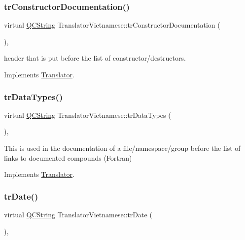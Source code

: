 \subsubsection{\texorpdfstring{trConstructorDocumentation()}{trConstructorDocumentation()}}
{\footnotesize\ttfamily virtual \mbox{\hyperlink{class_q_c_string}{Q\+C\+String}} Translator\+Vietnamese\+::tr\+Constructor\+Documentation (\begin{DoxyParamCaption}{ }\end{DoxyParamCaption})\hspace{0.3cm}{\ttfamily [inline]}, {\ttfamily [virtual]}}

header that is put before the list of constructor/destructors. 

Implements \mbox{\hyperlink{class_translator}{Translator}}.

\mbox{\label{class_translator_vietnamese_a020eebcdccda4b0cb6abeb2f78e566b3}} 
\subsubsection{\texorpdfstring{trDataTypes()}{trDataTypes()}}
{\footnotesize\ttfamily virtual \mbox{\hyperlink{class_q_c_string}{Q\+C\+String}} Translator\+Vietnamese\+::tr\+Data\+Types (\begin{DoxyParamCaption}{ }\end{DoxyParamCaption})\hspace{0.3cm}{\ttfamily [inline]}, {\ttfamily [virtual]}}

This is used in the documentation of a file/namespace/group before the list of links to documented compounds (Fortran) 

Implements \mbox{\hyperlink{class_translator}{Translator}}.

\mbox{\label{class_translator_vietnamese_a717e57abc613c4ded493be4c640b304e}} 
\subsubsection{\texorpdfstring{trDate()}{trDate()}}
{\footnotesize\ttfamily virtual \mbox{\hyperlink{class_q_c_string}{Q\+C\+String}} Translator\+Vietnamese\+::tr\+Date (\begin{DoxyParamCaption}{ }\end{DoxyParamCaption})\hspace{0.3cm}{\ttfamily [inline]}, {\ttfamily [virtual]}}

